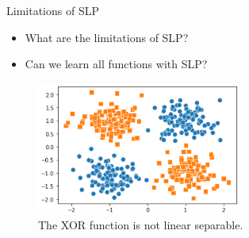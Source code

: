 \begin{frame}{Limitations of SLP}
    \begin{itemize}
        \item What are the limitations of SLP?
        \item Can we learn all functions with SLP?
    \end{itemize}
    \begin{figure}[H]
        \centering
        \includegraphics[width=0.6\textwidth]{Figs/xor.png}
        \caption{The XOR function is not linear separable.}
    \end{figure}
\end{frame}

